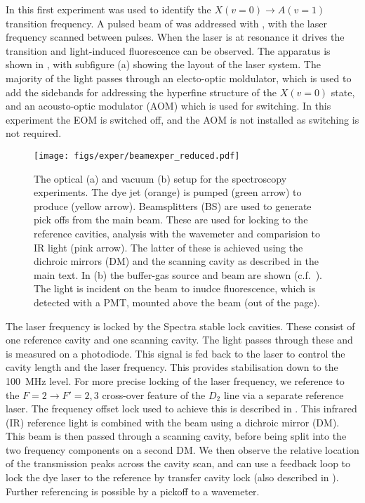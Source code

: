 In this first experiment  was used to identify the $X(v=0)
\rightarrow A(v=1)$ transition frequency. A pulsed beam of \CaF{} was addressed
with , with the laser frequency scanned between pulses.  When the
laser is at resonance it drives the transition and light-induced fluorescence
can be observed. The apparatus is shown in , with
subfigure (a) showing the layout of the  laser system. The
majority of the light passes through an electo-optic moldulator, which is used
to add the sidebands for addressing the hyperfine structure of the $X(v=0)$
state, and an acousto-optic modulator (AOM) which is used for switching. In
this experiment the EOM is switched off, and the AOM is not installed as
switching is not required.

\begin{figure}
  \centering
  \texttt{[image: figs/exper/beamexper\_reduced.pdf]}
  \caption[Optical and vacuum setup for RROC spectroscopy experiment]{
    The optical (a) and vacuum (b) setup for the spectroscopy
    experiments. The dye jet (orange) is pumped (green
    arrow) to produce  (yellow arrow). Beamsplitters (BS) are used
    to generate pick offs from the main beam. These are used for locking to the
    reference cavities, analysis with the wavemeter and comparision to IR light
    (pink arrow). The latter of these is achieved using the dichroic mirrors
    (DM) and  the scanning cavity as described in the main text. In (b) the
    buffer-gas source and \CaF{} beam are shown
    (c.f.~). The  light is
    incident on the beam to inudce fluorescence, which is detected with a PMT,
    mounted above the beam (out of the page).
  }
  \label{exper:fig:beamapp} 
\end{figure}

The laser frequency is locked by the Spectra stable lock cavities. These
consist of one reference cavity and one scanning cavity. The light passes
through these and is measured on a photodiode. This signal is fed back to the
laser to control the cavity length and the laser frequency. This provides
stabilisation down to the \SI{100}{\mega\hertz} level. For more precise locking
of the laser frequency, we reference  to the $F=2 \rightarrow
F'=2, 3$ cross-over feature of the \esRb{} $D_2$ line via a separate reference
laser. The frequency offset lock used to achieve this is described in
. This infrared (IR) reference light is combined with
the  beam using  a dichroic mirror (DM). This beam is then passed
through a scanning cavity, before being split into the two frequency components
on a second DM. We then observe the relative location of the transmission peaks
across the cavity scan, and can use a feedback loop to lock the dye laser to
the reference by transfer cavity lock (also described in
). Further referencing is possible by a pickoff to a
wavemeter. %

